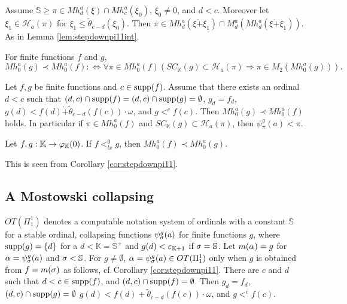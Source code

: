 \documentclass{article}
\newcommand{\mS}{\mathbb{S}}
\newcommand{\mK}{\mathbb{K}}
\begin{document}
\blem\label{lem:stepdownpi11}
Assume $\mathbb{S}\geq\pi\in Mh^{a}_{d}(\xi)\cap Mh^{a}_{c}(\xi_{0})$, $\xi_{0}\neq 0$,
and $d<c$.
Moreover let $\xi_{1}\in\mathcal{H}_{a}(\pi)$ for 
$\xi_{1}\leq\tilde{\theta}_{c-d}(\xi_{0})$.
Then
$\pi\in Mh^{a}_{d}(\xi\dot{+}\xi_{1})\cap M^{a}_{d}(Mh^{a}_{d}(\xi\dot{+}\xi_{1}))$.
\elem
\bprf
As in Lemma \ref{lem:stepdownpi11int}.
\eprf




\bdf\label{df:nfform2}
{\rm
For finite functions $f$ and $g$,
\[
 Mh^{a}_{0}(g)\prec Mh^{a}_{0}(f)
 :\Leftrightarrow 
\forall\pi\in Mh^{a}_{0}(f)
\left(
SC_{\mK}(g)\subset\mathcal{H}_{a}(\pi) \Rightarrow \pi\in M_{2}(Mh^{a}_{0}(g))
\right)
.
\]
}
\edf



\bcor\label{cor:stepdownpi11}
Let $f,g$ be finite functions and $c\in{\rm supp}(f)$.
Assume  that 
there exists an ordinal
$d<c$ 
such that
$(d,c)\cap {\rm supp}(f)=(d,c)\cap {\rm supp}(g)=\emptyset$, 
$g_{d}=f_{d}$, 
$g(d)<f(d)\dot{+}\tilde{\theta}_{c-d}(f(c))\cdot\omega$,
and
$g<^{c}f(c)$.
Then
$Mh^{a}_{0}(g)\prec Mh^{a}_{0}(f)$ holds.
In particular if $\pi\in Mh^{a}_{0}(f)$ and
$SC_{\mK}(g)\subset\mathcal{H}_{a}(\pi)$, then
$\psi_{\pi}^{g}(a)<\pi$.
\ecor










\bprp\label{lem:psinucomparison}

Let $f,g:\mK\to\vphi_{\mK}(0)$.
If $f<^{0}_{lx}g$, then
$Mh^{a}_{0}(f)\prec Mh^{a}_{0}(g)$.

\eprp
\bprf
This is seen from Corollary \ref{cor:stepdownpi11}.
\eprf




\subsection{A Mostowski collapsing}
$OT(\Pi^{1}_{1})$ denotes a computable notation system of ordinals
with a constant $\mS$ for a stable ordinal,
collapsing functions $\psi_{\sigma}^{g}(a)$ for finite functions $g$, where
${\rm supp}(g)=\{d\}$ for a $d<\mK=\mS^{+}$ and $g(d)<\veps_{\mK+1}$ if $\sig=\mS$.
Let $m(\alpha)=g$ for $\alpha=\psi_{\sigma}^{g}(a)$ and $\sig<\mS$.
For $g\neq\emptyset$, $\alpha=\psi_{\sigma}^{g}(a)\in OT(\Pi^{1}_{1})$ only when
$g$ is obtained from $f=m(\sigma)$ as follows, cf.\,Corollary \ref{cor:stepdownpi11}.
There are $c$ and $d$ such that $d<c\in {\rm supp}(f)$,
and $(d,c)\cap {\rm supp}(f)=\emptyset$.
Then 
$g_{d}=f_{d}$, $(d,c)\cap {\rm supp}(g)=\emptyset$
$g(d)<f(d)+\tilde{\theta}_{c-d}(f(c))\cdot\omega$, 
and $g<^{c}f(c)$.
\end{document}
